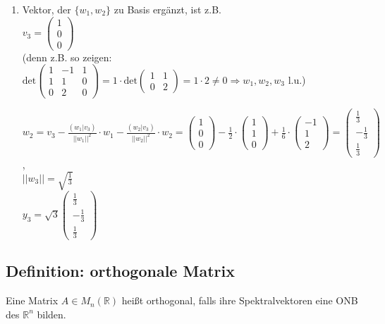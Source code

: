 \begin{enumerate}
\item
Vektor, der $\lbrace w_1,w_2\rbrace$ zu Basis ergänzt, ist z.B.\\
$v_3=\begin{pmatrix}1 \\ 0 \\ 0\end{pmatrix}$\\
(denn z.B. so zeigen: $\mathrm{det}\begin{pmatrix}1 & -1 & 1 \\ 1 & 1 & 0 \\ 0 & 2 & 0\end{pmatrix}=1\cdot \mathrm{det}\begin{pmatrix}1 & 1 \\ 0 & 2\end{pmatrix}=1\cdot 2\neq 0 \Rightarrow w_1,w_2,w_3$ l.u.)

$w_2=v_3-\frac{(w_1|v_3)}{||w_1||^2}\cdot w_1-\frac{(w_2|v_3)}{||w_2||^2}\cdot w_2 = \begin{pmatrix}1 \\ 0 \\ 0\end{pmatrix}-\frac{1}{2}\cdot \begin{pmatrix}1 \\ 1 \\ 0\end{pmatrix}+\frac{1}{6}\cdot \begin{pmatrix}-1 \\ 1 \\ 2\end{pmatrix}=\begin{pmatrix}\frac{1}{3} \\ -\frac{1}{3} \\ \frac{1}{3}\end{pmatrix}$,\\
$||w_3||=\sqrt{\frac{1}{3}}$\\
$y_3=\sqrt{3}\begin{pmatrix}\frac{1}{3} \\ -\frac{1}{3} \\ \frac{1}{3}\end{pmatrix}$
\end{enumerate}

\subsection{Definition: orthogonale Matrix}
Eine Matrix $A\in M_n(\mathbb{R})$ heißt orthogonal, falls ihre Spektralvektoren eine ONB des $\mathbb{R}^n$ bilden.


